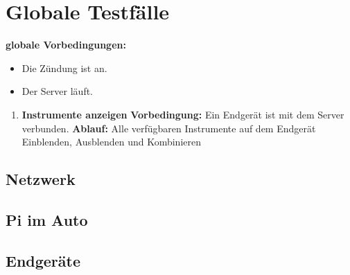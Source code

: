 \documentclass[pflichtenheft.tex]{subfiles}
\begin{document}
\chapter{Globale Testfälle}
\textbf{globale Vorbedingungen:}
\begin{itemize}
\item
Die Zündung ist an.
\item
Der Server läuft.
\end{itemize}

\begin{enumerate}

\item{\textbf{Instrumente anzeigen}}
\textbf{Vorbedingung: } Ein Endgerät ist mit dem Server verbunden.
\textbf{Ablauf: } Alle verfügbaren Instrumente auf dem Endgerät Einblenden, Ausblenden und Kombinieren

\end{enumerate}

\section{Netzwerk}
\section{Pi im Auto}
\section{Endgeräte}
\end{document}
